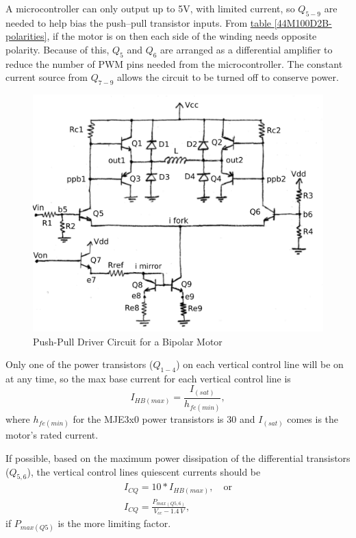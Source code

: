 \documentclass[10pt, twocolumn]{article}
\begin{document}
A microcontroller can only output up to 5V, with limited current, so
$Q_{5-9}$ are needed to help bias the push--pull transistor inputs.
From \hyperref[44M100D2B-polarities]{table \ref{44M100D2B-polarities}},
if the motor is on then each side of the winding needs opposite
polarity. Because of this,
$Q_{5}$ and $Q_{6}$ are arranged as a differential amplifier
to reduce the number of PWM pins needed from the microcontroller.
The constant current source from $Q_{7-9}$ allows the circuit to be turned
off to conserve power.

\begin{figure}
	\centering
	\includegraphics[width=.65\textwidth]{Figures/motor-driver-circuit.pdf}
	\caption{Push-Pull Driver Circuit for a Bipolar Motor}
	\label{motor-driver-circuit}
\end{figure}

Only one of the power transistors ($Q_{1-4}$) on each vertical control line
will be on at any time, so the max base current for each vertical control line is
\begin{equation*}
I_{HB(max)}=\frac{I_{(sat)}}{h_{fe(min)}},
\end{equation*}
where $h_{fe(min)}$ for the MJE3x0 power transistors is 30 and $I_{(sat)}$ comes
is the motor's rated current.

If possible, based on the maximum power dissipation of the differential transistors
($Q_{5,6}$), the vertical control lines quiescent currents should be
\begin{equation}
\begin{array}{c}
I_{CQ}=10*I_{HB(max)},\quad\textrm{or}\\
I_{CQ}=\frac{P_{max(Q5,6)}}{V_{cc}-1.4\,V},
\end{array}
\label{vertical-control-line-quiescent-current}
\end{equation}
if $P_{max(Q5)}$ is the more limiting factor.
\end{document}

